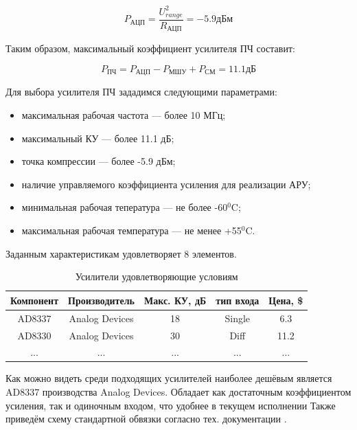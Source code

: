 \documentclass[utf8x, 14pt, oneside, a4paper]{article}
\begin{document}
				\begin{equation}
					\label{eq:amp0}
					P_{\text{АЦП}}=\frac{U_{range}^{2}}{R_{\text{АЦП}}}=-5.9 \text{дБм}
				\end{equation}
			
				Таким образом, максимальный коэффициент усилителя ПЧ составит:
				
				\begin{equation}
					\label{eq:amp1}
					P_{\text{ПЧ}}=P_{\text{АЦП}}-P_{\text{МШУ}}+P_{\text{СМ}}=11.1 \text{дБ}
				\end{equation}
			
				Для выбора усилителя ПЧ зададимся следующими параметрами:
				
				\begin{itemize}
					\item максимальная рабочая частота --- более 10 МГц;
					\item максимальный КУ --- более 11.1 дБ;
					\item точка компрессии --- более -5.9 дБм;
					\item наличие управляемого коэффициента усиления для реализации АРУ;
					\item минимальная рабочая тепература --- не более -60$^0$C;
					\item максимальная рабочая температура --- не менее +55$^0$C.
				\end{itemize}
				
				\vspace{\baselineskip}
				
				Заданным характеристикам удовлетворяет 8 элементов.
				
				\begin{table}[H]	
					\centering
					\begin{tabular}{|c|c|c|c|c|}
						\hline
						Компонент & Производитель & Макс. КУ, дБ & тип входа & Цена, \$ \\
						\hline
						AD8337 & Analog Devices & 18 & Single & 6.3 \\
						\hline
						AD8330 & Analog Devices & 30 & Diff & 11.2 \\
						\hline
						... & ... & ... & ... & ... \\
						\hline
					\end{tabular}
					\caption{Усилители удовлетворяющие условиям}
					\label{table:Amp2}
				\end{table}
				
				Как можно видеть среди подходящих усилителей наиболее дешёвым является AD8337 производства Analog Devices. Обладает как достаточным коэффициентом усиления, так и одиночным входом, что удобнее в текущем исполнении Также приведём схему стандартной обвязки согласно тех. документации \cite{bib:docs:AD8337}.
				
\end{document}
